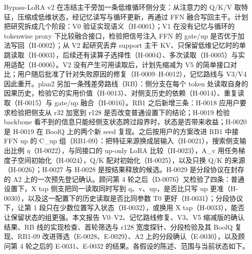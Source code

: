 \documentclass[11pt]{article}
\begin{document}
Bypass-LoRA v2 在冻结主干旁加一条低维循环侧分支：从注意力的 Q/K/V 取特征，压缩成低维状态，经记忆读写与循环更新，再通过 FFN 融合写回主干。计划把研究拆成几个阶段：V0 验证实现语义（H-0001）；V1 在没有记忆与循环的 tokenwise proxy 下比较融合接口，检验把信号注入 FFN 的 gate/up 是否优于加法写回（H-0002）；从 V2 起研究丢弃 support 主干 KV、只保留低维记忆时的单跳读取（H-0003），后续还有读算子选择性（H-0004）、多次读取（H-0005）与实用适配（H-0006）。V2 没有产生可用读取后，计划先缩减为 V5 的简单接口对比；用户随后批准了针对失败原因的修复（H-0009--H-0012），记忆路线与 V3/V4 因此重开。plan2 另加一条残差旁路线（RB）：侧分支在每个 token 处读取自身的因果历史，检验它的实用价值（H-0013）、对侧支历史的依赖（H-0014）、重复读取（H-0015）与 gate/up 融合（H-0016）。RB1 之后新增三条：H-0018 应用户要求检验把侧支从 r32 加宽到 r128 是否改变普通设置下的结论；H-0019 检验 backbone 看不到的信息只能经侧支状态跨过段界时，状态是否带来收益；H-0020 是 H-0019 在 BoolQ 上的两个新 seed 复现。之后按用户的方案改进 RB1 中接 FFN up 的 C\_up 组（RB1-09）：把特征来源换成层输入（H-0021），搜索侧支输出比例 $\eta$（H-0022），与同接口的 up-only LoRA 比较（H-0023），A\_v 用任务梯度子空间初始化（H-0024），Q/K 配对初始化（H-0025），以及只换 Q/K 的来源（H-0026）；H-0027 与 H-0028 是按结果释放的候选。H-0029 是分段协议在封存的 A2 上的一次预先登记确认。顾问第 4 轮之后（D-0076）又检验了四条：普通设置下，X tap 侧支把同一读取同时写到 q、v、up，是否比只写 up 更准（H-0030），以及这一配置下的历史读取是否比同参数 T0 更好（H-0031）；分段协议下，让第 1 段只在少数位置写入状态（H-0032），或换用 X tap（H-0033），能否让保留状态的组更强。本文报告 V0--V2、记忆路线修复、V3、V5 缩减版的确认结果、RB 线的实现检查、首轮筛选与 r128 宽度探针、分段检验及其 BoolQ 复现、RB1-09 改进筛选（E-0028、E-0029）、A2 上的分段确认（E-0030），以及顾问第 4 轮之后的 E-0031、E-0032 的结果。各假设的陈述、范围与当前状态如下。
\end{document}
